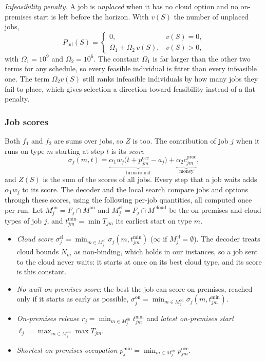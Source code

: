 \documentclass[conference]{IEEEtran}
\begin{document}
\emph{Infeasibility penalty.} A job is \emph{unplaced} when it has no cloud option and no on-premises start is left before the horizon. With $v(S)$ the number of unplaced jobs,
\begin{equation}
 P_{\mathrm{inf}}(S)=
 \begin{cases}
  0, & v(S)=0,\\
  \Omega_1+\Omega_2\,v(S), & v(S)>0,
 \end{cases}
\end{equation}
with $\Omega_1=10^9$ and $\Omega_2=10^6$. The constant $\Omega_1$ is far larger than the other two terms for any schedule, so every feasible individual is fitter than every infeasible one. The term $\Omega_2v(S)$ still ranks infeasible individuals by how many jobs they fail to place, which gives selection a direction toward feasibility instead of a flat penalty.

\subsubsection{Job scores}
Both $f_1$ and $f_2$ are sums over jobs, so $Z$ is too. The contribution of job $j$ when it runs on type $m$ starting at step $t$ is its \emph{score}
\begin{equation}
 \sigma_j(m,t)=\underbrace{\alpha_1w_j\bigl(t+p_{jm}^{\mathrm{occ}}-a_j\bigr)}_{\text{turnaround}}+\underbrace{\alpha_2c_{jm}^{\mathrm{proc}}}_{\text{money}},
\end{equation}
and $Z(S)$ is the sum of the scores of all jobs. Every step that a job waits adds $\alpha_1w_j$ to its score. The decoder and the local search compare jobs and options through these scores, using the following per-job quantities, all computed once per run. Let $M_j^{\mathrm{on}}=F_j\cap M^{\mathrm{on}}$ and $M_j^{\mathrm{cl}}=F_j\cap M^{\mathrm{cloud}}$ be the on-premises and cloud types of job $j$, and $t_{jm}^{\min}=\min T_{jm}$ its earliest start on type $m$.
\begin{itemize}
 \item \emph{Cloud score} $\sigma_j^{\mathrm{cl}}=\min_{m\in M_j^{\mathrm{cl}}}\sigma_j(m,t_{jm}^{\min})$ ($\infty$ if $M_j^{\mathrm{cl}}=\emptyset$). The decoder treats cloud bounds $N_m$ as non-binding, which holds in our instances, so a job sent to the cloud never waits: it starts at once on its best cloud type, and its score is this constant.
 \item \emph{No-wait on-premises score}: the best the job can score on premises, reached only if it starts as early as possible, $\sigma_j^{\mathrm{on}}=\min_{m\in M_j^{\mathrm{on}}}\sigma_j(m,t_{jm}^{\min})$.
 \item \emph{On-premises release} $r_j=\min_{m\in M_j^{\mathrm{on}}}t_{jm}^{\min}$ and \emph{latest on-premises start} $\ell_j=\max_{m\in M_j^{\mathrm{on}}}\max T_{jm}$.
 \item \emph{Shortest on-premises occupation} $p_j^{\min}=\min_{m\in M_j^{\mathrm{on}}}p_{jm}^{\mathrm{occ}}$.
\end{itemize}
\end{document}
